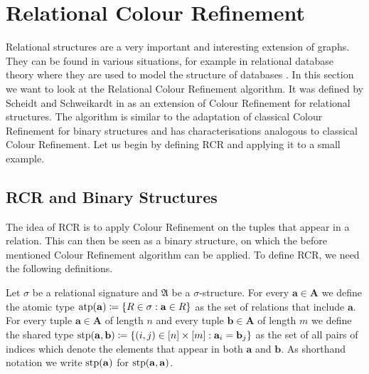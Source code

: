 \section{Relational Colour Refinement}
\label{sec:RelationalColourRefinement}

Relational structures are a very important and interesting extension of graphs.
They can be found in various situations, for example in relational database theory where they are used to model the structure of databases \cite{abiteboul1996FoundationsDatabases}.
In this section we want to look at the Relational Colour Refinement algorithm. 
It was defined by Scheidt and Schweikardt in \cite{scheidt2025ColorRefinement} as an extension of Colour Refinement for relational structures.
The algorithm is similar to the adaptation of classical Colour Refinement for binary structures and has characterisations analogous to classical Colour Refinement.
Let us begin by defining RCR and applying it to a small example.

\subsection{RCR and Binary Structures}

The idea of RCR is to apply Colour Refinement on the tuples that appear in a relation.
This can then be seen as a binary structure, on which the before mentioned Colour Refinement algorithm can be applied.
To define RCR, we need the following definitions.

\begin{definition}
	Let $\sigma$ be a relational signature and $\mathfrak A$ be a $\sigma$-structure.
	For every $\mathbf a \in \mathbf A$ we define the atomic type $\operatorname{atp}(\mathbf a)\coloneqq \{R \in \sigma : \mathbf a\in R\}$ as the set of relations that include $\mathbf a$.
	For every tuple $\mathbf a\in \mathbf A$ of length $n$ and every tuple $\mathbf b\in \mathbf A$ of length $m$ we define the shared type $\operatorname{stp}(\mathbf a, \mathbf b)\coloneqq\{(i, j) \in [n]\times [m] : \mathbf a_i=\mathbf b_j\}$ as the set of all pairs of indices which denote the elements that appear in both $\mathbf a$ and $\mathbf b$.
	As shorthand notation we write $\operatorname{stp}(\mathbf a)$ for $\operatorname{stp}(\mathbf a, \mathbf a)$.
\end{definition}

